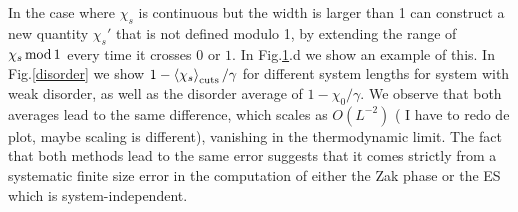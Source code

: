 \documentclass[twocolumn,amsmath,longbibliography,amssymb,superscriptaddress]{revtex4-1}
\newcommand{\carlos}[1]{{\color{red} #1}}
\begin{document}
\begin{figure}[h!]
\centering
{}\hspace{0mm}

\hspace{0mm}

\label{inh}
\end{figure}

In the case where $\chi_s$ is continuous but the width is larger than 1 can construct a new quantity $\chi_s'$ that is not defined modulo 1, by extending the range of $\chi_s \, {\rm mod} \, 1$ every time it crosses $0$ or $1$. In Fig.\ref{inh}.d we show an example of this. In Fig.\ref{disorder} we show $1-\expval{\chi_s}_{\rm cuts}/\gamma$ for different system lengths for system with weak disorder, as well as the disorder average of $1-\chi_0/\gamma$. We observe that both averages lead to the same difference, which scales as $O(L^{-2})$ (\carlos{I have to redo de plot, maybe scaling is different}), vanishing in the thermodynamic limit. The fact that both methods lead to the same error suggests that it comes strictly from a systematic finite size error in the computation of either the Zak phase or the ES which is system-independent. 
\end{document}
